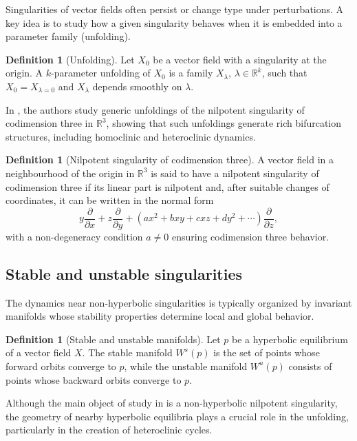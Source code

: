 \documentclass[12pt, a4paper, oneside]{book}
\theoremstyle{plain}
\theoremstyle{definition}
\newtheorem{definition}[theorem]{Definition}
\theoremstyle{remark}
\theoremstyle{definition}
\begin{document}
Singularities of vector fields often persist or change type under perturbations. A key idea is to study how a given singularity behaves when it is embedded into a parameter family (unfolding).

\begin{definition}[Unfolding]
Let $X_0$ be a vector field with a singularity at the origin. A $k$-parameter unfolding of $X_0$ is a family $X_\lambda$, $\lambda \in \mathbb{R}^k$, such that $X_0 = X_{\lambda=0}$ and $X_\lambda$ depends smoothly on $\lambda$.
\end{definition}

In \cite{ibanez2005shil}, the authors study generic unfoldings of the nilpotent singularity of codimension three in $\mathbb{R}^3$, showing that such unfoldings generate rich bifurcation structures, including homoclinic and heteroclinic dynamics.

\begin{definition}[Nilpotent singularity of codimension three]
A vector field in a neighbourhood of the origin in $\mathbb{R}^3$ is said to have a nilpotent singularity of codimension three if its linear part is nilpotent and, after suitable changes of coordinates, it can be written in the normal form
\[
y\frac{\partial}{\partial x} + z\frac{\partial}{\partial y} + \left( ax^2 + bxy + cxz + dy^2 + \cdots \right)\frac{\partial}{\partial z},
\]
with a non-degeneracy condition $a \neq 0$ ensuring codimension three behavior.
\end{definition}

\subsection{Stable and unstable singularities}

The dynamics near non-hyperbolic singularities is typically organized by invariant manifolds whose stability properties determine local and global behavior.

\begin{definition}[Stable and unstable manifolds]
Let $p$ be a hyperbolic equilibrium of a vector field $X$. The stable manifold $W^s(p)$ is the set of points whose forward orbits converge to $p$, while the unstable manifold $W^u(p)$ consists of points whose backward orbits converge to $p$.
\end{definition}

Although the main object of study in \cite{ibanez2005shil} is a non-hyperbolic nilpotent singularity, the geometry of nearby hyperbolic equilibria plays a crucial role in the unfolding, particularly in the creation of heteroclinic cycles.
\end{document}
